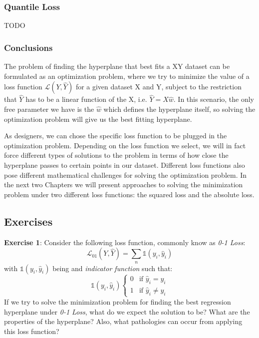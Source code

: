 \subsubsection{Quantile Loss}

TODO

\subsubsection{Conclusions}
The problem of finding the hyperplane that best fits a XY dataset can be formulated as an optimization problem, where we try to minimize the value of a loss function $\mathcal{L}(Y, \hat{Y})$ for a given dataset X and Y, subject to the restriction that $\hat{Y}$ has to be a linear function of the X, i.e. $\hat{Y} = X \hat{w}$. In this scenario, the only free parameter we have is the $\hat{w}$ which defines the hyperplane itself, so solving the optimization problem will give us the best fitting hyperplane.


As designers, we can chose the specific loss function to be plugged in the optimization problem. Depending on the loss function we select, we will in fact force different types of solutions to the problem in terms of how close the hyperplane passes to certain points in our dataset. Different loss functions also pose different mathematical challenges for solving the optimization problem. In the next two Chapters we will present approaches to solving the minimization problem under two different loss functions: the  squared loss and the absolute loss.

\subsection{Exercises}
\textbf{Exercise 1}: Consider the following loss function, commonly know as \emph{0-1 Loss}:
\begin{equation}
\mathcal{L}_{01}(Y, \hat{Y}) = \sum_n \mathds{1}(y_i, \hat{y}_i) 
\end{equation}
with $\mathds{1}(y_i, \hat{y}_i)$ being and \emph{indicator function} such that:
\begin{equation}
\mathds{1}(y_i, \hat{y}_i)
  \begin{cases}
  0 & \text{if $\hat{y}_i = y_i$} \\
  1 & \text{if $\hat{y}_i \ne y_i$}
  \end{cases}
\end{equation}
If we try to solve the minimization problem \label{eq.fundamental_minimization_problem} for finding the best regression hyperplane under \emph{0-1 Loss}, what do we expect the solution to be? What are the properties of the hyperplane? Also, what pathologies can occur from applying this loss function?
\\

